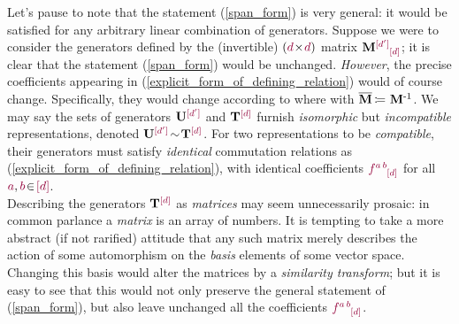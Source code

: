 \documentclass[12pt,a4paper]{article}\let\ifpdf\relax
\begin{document}
Let's pause to note that the statement (\ref{span_form}) is very general: it would be satisfied for any arbitrary linear combination of generators. Suppose we were to consider the generators
%
%
defined by the (invertible) $(\r{d}\!\times\!\r{d})$ matrix $\mathbf{M}\indices{\r{[{d}']}}{\r{[d]}}$; it is clear that the statement (\ref{span_form}) would be unchanged. \emph{However}, the precise coefficients appearing in (\ref{explicit_form_of_defining_relation}) would of course change. Specifically, they would change according to
%
%
where
%
%
with $\mathbf{\bar{M}}\equivR\mathbf{M}^{\text{-}1}$. We may say the sets of generators $\mathbf{U}\indices{\r{[d']}}{}$ and $\mathbf{T}\indices{\r{[d]}}{}$ furnish \emph{isomorphic} but \emph{incompatible} representations, denoted $\mathbf{U}\indices{\r{[d']}}{}\!\sim\!\mathbf{T}\indices{\r{[d]}}{}$. For two representations to be \emph{compatible}, their generators must satisfy \emph{identical} commutation relations as (\ref{explicit_form_of_defining_relation}), with identical coefficients $\r{f}\indices{\r{a\,b}}{\r{[d]}}$ for all $\r{a},\r{b}\!\in\!\r{[d]}$.\\[-10pt]


Describing the generators $\mathbf{T}\indices{\r{[d]}}{}$ as \emph{matrices} may seem unnecessarily prosaic: in common parlance a \emph{matrix} is an array of numbers. It is tempting to take a more abstract (if not rarified) attitude that any such matrix merely describes the action of some automorphism on the \emph{basis} elements of some vector space. Changing this basis would alter the matrices by a \emph{similarity transform}; but it is easy to see that this would not only preserve the general statement of (\ref{span_form}), but also leave unchanged all the coefficients $\r{f}\indices{\r{a\,b}}{\r{[d]}}$. 
\end{document}
